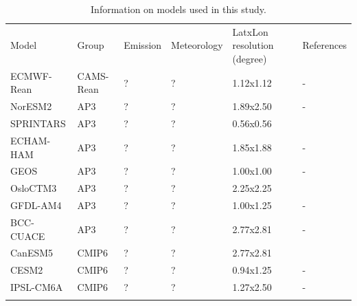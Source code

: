 \documentclass[journal abbreviation, manuscript]{copernicus}
\begin{document}
\begin{table}
 \begin{tabularx}{\textwidth}{lllllX}
  \tophline
  Model      & Group     & Emission & Meteorology & LatxLon resolution (degree) & References                                                          \\
  \middlehline
  ECMWF-Rean & CAMS-Rean & ?        & ?           & 1.12x1.12                   & -                                                                   \\
  NorESM2    & AP3       & ?        & ?           & 1.89x2.50                   & -                                                                   \\
  SPRINTARS  & AP3       & ?        & ?           & 0.56x0.56                   & \cite{takemura2000global,takemura2002single,takemura2005simulation} \\
  ECHAM-HAM  & AP3       & ?        & ?           & 1.85x1.88                   & -                                                                   \\
  GEOS       & AP3       & ?        & ?           & 1.00x1.00                   & -                                                                   \\
  OsloCTM3   & AP3       & ?        & ?           & 2.25x2.25                   & \cite{lund2018concentrations,myhre2009modelled}                     \\
  GFDL-AM4   & AP3       & ?        & ?           & 1.00x1.25                   & -                                                                   \\
  BCC-CUACE  & AP3       & ?        & ?           & 2.77x2.81                   & -                                                                   \\
  CanESM5    & CMIP6     & ?        & ?           & 2.77x2.81                   & \cite{gmd-12-4823-2019}                                             \\
  CESM2      & CMIP6     & ?        & ?           & 0.94x1.25                   & -                                                                   \\
  IPSL-CM6A  & CMIP6     & ?        & ?           & 1.27x2.50                   & -                                                                   \\
  \bottomhline
 \end{tabularx}
 \caption{Information on models used in this study.}
 \label{table:models}
\end{table}
\end{document}
